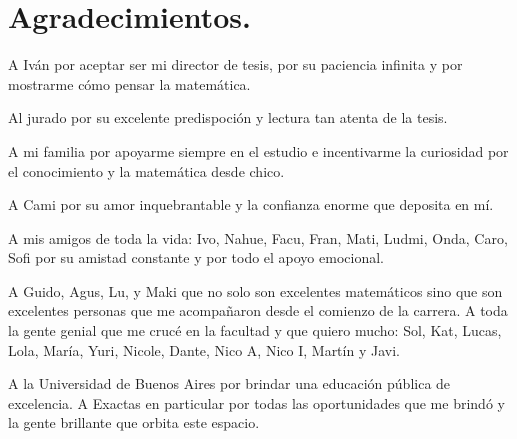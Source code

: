 \documentclass[tesis.tex]{subfiles}
\begin{document}
\chapter*{Agradecimientos.}

A Iván por aceptar ser mi director de tesis, por su paciencia infinita y por mostrarme cómo pensar la matemática.

Al jurado por su excelente predispoción y lectura tan atenta de la tesis.

A mi familia por apoyarme siempre en el estudio e incentivarme la curiosidad por el conocimiento y la matemática desde chico. 

A Cami por su amor inquebrantable y la confianza enorme que deposita en mí. 

A mis amigos de toda la vida: Ivo, Nahue, Facu, Fran, Mati, Ludmi, Onda, Caro, Sofi por su amistad constante y por todo el apoyo emocional.

A Guido, Agus, Lu, y Maki que no solo son excelentes matemáticos sino que son excelentes personas que me acompañaron desde el comienzo de la carrera.
A toda la gente genial que me crucé en la facultad y que quiero mucho: Sol, Kat, Lucas, Lola, María, Yuri, Nicole, Dante, Nico A, Nico I, Martín y Javi.


A la Universidad de Buenos Aires por brindar una educación pública de excelencia. 
A Exactas en particular por todas las oportunidades que me brindó y la gente brillante que orbita este espacio.
\end{document}
